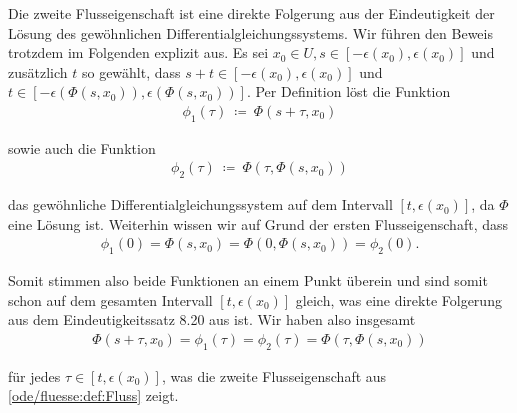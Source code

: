 \documentclass[letterpaper,10pt,english]{jupyterBook}
\begin{document}
\begin{emphBox}{}{}
\par
Die zweite Flusseigenschaft ist eine direkte Folgerung aus der Eindeutigkeit der Lösung des gewöhnlichen Differentialgleichungssystems.
Wir führen den Beweis trotzdem im Folgenden explizit aus.
Es sei \(x_0\in U, s\in [-\epsilon(x_0), \epsilon(x_0)]\) und zusätzlich \(t\) so gewählt, dass \(s+t \in [-\epsilon(x_0), \epsilon(x_0)]\) und \(t\in [-\epsilon(\Phi(s,x_0)), \epsilon(\Phi(s,x_0))]\).
Per Definition löst die Funktion
\begin{align*}
\phi_1(\tau) \ \coloneqq \ \Phi(s + \tau, x_0)
\end{align*}
\par
sowie auch die Funktion
\begin{align*}
\phi_2(\tau) \ \coloneqq \ \Phi(\tau, \Phi(s,x_0))
\end{align*}
\par
das gewöhnliche Differentialgleichungssystem auf dem Intervall \([t, \epsilon(x_0)]\), da \(\Phi\) eine Lösung ist.
Weiterhin wissen wir auf Grund der ersten Flusseigenschaft, dass
\begin{align*}
\phi_1(0) = \Phi(s, x_0) = \Phi(0, \Phi(s, x_0)) = \phi_2(0).
\end{align*}
\par
Somit stimmen also beide Funktionen an einem Punkt überein und sind somit schon auf dem gesamten Intervall \([t, \epsilon(x_0)]\) gleich, was eine direkte Folgerung aus dem Eindeutigkeitssatz 8.20 aus \cite{Ten21} ist.
Wir haben also insgesamt
\begin{align*}
\Phi(s + \tau, x_0) = \phi_1(\tau) = \phi_2(\tau) = \Phi(\tau, \Phi(s,x_0))
\end{align*}
\par
für jedes \(\tau\in [t, \epsilon(x_0)]\), was die zweite Flusseigenschaft aus \cref{ode/fluesse:def:Fluss} zeigt.
\end{emphBox}
\end{document}
